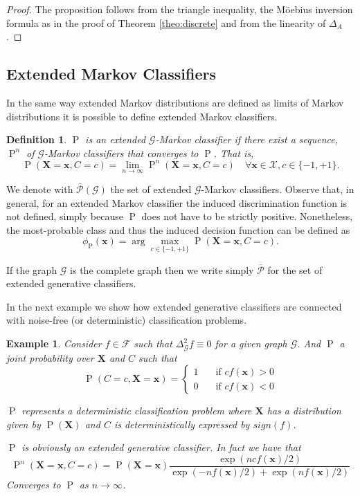 \documentclass[11pt,a4paper, twoside]{book}
\newtheorem{example}{Example}[chapter]
\newtheorem{definition}{Definition}[chapter]
\newcommand{\Pp}{\operatorname{P}}
\newcommand{\bx}{\mathbf{x}}
\newcommand{\bX}{\mathbf{X}}
\newcommand{\bchi}{\boldsymbol{\mathcal{X}}}
\begin{document}
\begin{proof}
The proposition follows from the triangle inequality, the M\"oebius inversion formula as in the proof of Theorem \ref{theo:discrete} and from the linearity of $\Delta_A$. 
\end{proof}

\subsection{Extended Markov Classifiers}
\label{sec:extend}

In the same way extended Markov distributions are defined as limits of Markov distributions it is possible to define extended Markov classifiers.

\begin{definition}
$\Pp$ is an extended $\mathcal{G}$-Markov classifier if there exist a sequence, $\Pp^{n}$ of $\mathcal{G}$-Markov classifiers that converges to $\Pp$. That is,
$$  \Pp(\bX=\bx, C = c) = \lim _{n \to \infty} \Pp^{n}(\bX=\bx, C = c) \quad \forall \bx \in \bchi, c \in \{-1,+1\}.$$ 
\end{definition}

We denote with $\overline{\mathcal{P}}(\mathcal{G})$ the set of extended $\mathcal{G}$-Markov classifiers.
Observe that, in general, for an extended Markov classifier the induced discrimination function is not defined, simply because $\Pp$ does not have to be strictly positive. Nonetheless, the most-probable class and thus the induced decision function can be defined as 
$$ \phi_{\Pp}(\bx)= \arg \max_{c\in\{-1,+1\}} \Pp(\bX=\bx, C = c). $$


If the graph $\mathcal{G}$ is the complete graph then we write simply $\overline{\mathcal{P}}$ for the set of extended generative classifiers. 

In the next example we show how extended generative classifiers are connected with noise-free (or deterministic) classification problems.
  
\begin{example}
\label{exp:deterministic}
Consider $f \in \mathcal{F}$ such that $\Delta_{\mathcal{G}}^{2}f\equiv 0$ for a given graph $\mathcal{G}$. And $\Pp$ a joint probability over $\bX$ and $C$ such that 
$$ \Pp(C = c , \bX = \bx) = \left\{ \begin{matrix}
1 &\quad \text{if }c f(\bx)>0 \\ 
0 &\quad  \text{if } cf(\bx) < 0 
\end{matrix} \right.
$$

$\Pp$ represents a deterministic classification problem where $\bX$ has a distribution given by $\Pp(\bX)$ and $C$ is deterministically expressed by $sign(f)$.

$\Pp$ is obviously an extended generative classifier. In fact we have that
$$ \Pp^{n}(\bX=\bx, C=c) = \Pp(\bX=\bx)\frac{\exp(ncf(\bx)/2) }{\exp(-nf(\bx)/2) + \exp(nf(\bx)/2)} $$
Converges to $\Pp$ as $n \to \infty$.

\end{example}
\end{document}
